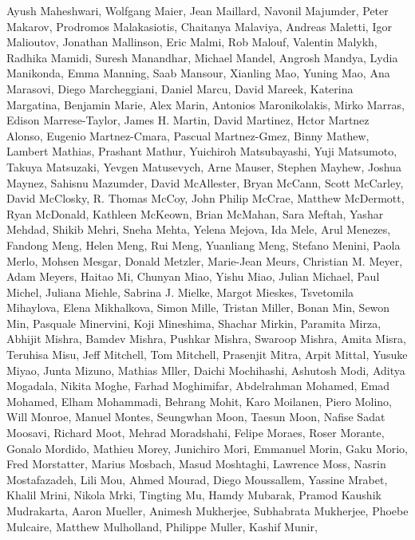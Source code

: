 \documentclass[11pt]{article}
\begin{document}
\begin{description}[itemsep=4mm, style=nextline]
Ayush Maheshwari, 
Wolfgang Maier, 
Jean Maillard, 
Navonil Majumder, 
Peter Makarov, 
Prodromos Malakasiotis, 
Chaitanya Malaviya, 
Andreas Maletti, 
Igor Malioutov, 
Jonathan Mallinson, 
Eric Malmi, 
Rob Malouf, 
Valentin Malykh, 
Radhika Mamidi, 
Suresh Manandhar, 
Michael Mandel, 
Angrosh Mandya, 
Lydia Manikonda, 
Emma Manning, 
Saab Mansour, 
Xianling Mao, 
Yuning Mao, 
Ana Marasovi, 
Diego Marcheggiani, 
Daniel Marcu, 
David Mareek, 
Katerina Margatina, 
Benjamin Marie, 
Alex Marin, 
Antonios Maronikolakis, 
Mirko Marras, 
Edison Marrese-Taylor, 
James H. Martin, 
David Martinez, 
Hctor Martnez Alonso, 
Eugenio Martnez-Cmara, 
Pascual Martnez-Gmez, 
Binny Mathew, 
Lambert Mathias, 
Prashant Mathur, 
Yuichiroh Matsubayashi, 
Yuji Matsumoto, 
Takuya Matsuzaki, 
Yevgen Matusevych, 
Arne Mauser, 
Stephen Mayhew, 
Joshua Maynez, 
Sahisnu Mazumder, 
David McAllester, 
Bryan McCann, 
Scott McCarley, 
David McClosky, 
R. Thomas McCoy, 
John Philip McCrae, 
Matthew McDermott, 
Ryan McDonald, 
Kathleen McKeown, 
Brian McMahan, 
Sara Meftah, 
Yashar Mehdad, 
Shikib Mehri, 
Sneha Mehta, 
Yelena Mejova, 
Ida Mele, 
Arul Menezes, 
Fandong Meng, 
Helen Meng, 
Rui Meng, 
Yuanliang Meng, 
Stefano Menini, 
Paola Merlo, 
Mohsen Mesgar, 
Donald Metzler, 
Marie-Jean Meurs, 
Christian M. Meyer, 
Adam Meyers, 
Haitao Mi, 
Chunyan Miao, 
Yishu Miao, 
Julian Michael, 
Paul Michel, 
Juliana Miehle, 
Sabrina J. Mielke, 
Margot Mieskes, 
Tsvetomila Mihaylova, 
Elena Mikhalkova, 
Simon Mille, 
Tristan Miller, 
Bonan Min, 
Sewon Min, 
Pasquale Minervini, 
Koji Mineshima, 
Shachar Mirkin, 
Paramita Mirza, 
Abhijit Mishra, 
Bamdev Mishra, 
Pushkar Mishra, 
Swaroop Mishra, 
Amita Misra, 
Teruhisa Misu, 
Jeff Mitchell, 
Tom Mitchell, 
Prasenjit Mitra, 
Arpit Mittal, 
Yusuke Miyao, 
Junta Mizuno, 
Mathias Mller, 
Daichi Mochihashi, 
Ashutosh Modi, 
Aditya Mogadala, 
Nikita Moghe, 
Farhad Moghimifar, 
Abdelrahman Mohamed, 
Emad Mohamed, 
Elham Mohammadi, 
Behrang Mohit, 
Karo Moilanen, 
Piero Molino, 
Will Monroe, 
Manuel Montes, 
Seungwhan Moon, 
Taesun Moon, 
Nafise Sadat Moosavi, 
Richard Moot, 
Mehrad Moradshahi, 
Felipe Moraes, 
Roser Morante, 
Gonalo Mordido, 
Mathieu Morey, 
Junichiro Mori, 
Emmanuel Morin, 
Gaku Morio, 
Fred Morstatter, 
Marius Mosbach, 
Masud Moshtaghi, 
Lawrence Moss, 
Nasrin Mostafazadeh, 
Lili Mou, 
Ahmed Mourad, 
Diego Moussallem, 
Yassine Mrabet, 
Khalil Mrini, 
Nikola Mrki, 
Tingting Mu, 
Hamdy Mubarak, 
Pramod Kaushik Mudrakarta, 
Aaron Mueller, 
Animesh Mukherjee, 
Subhabrata Mukherjee, 
Phoebe Mulcaire, 
Matthew Mulholland, 
Philippe Muller, 
Kashif Munir, 

\end{description}
\end{document}
